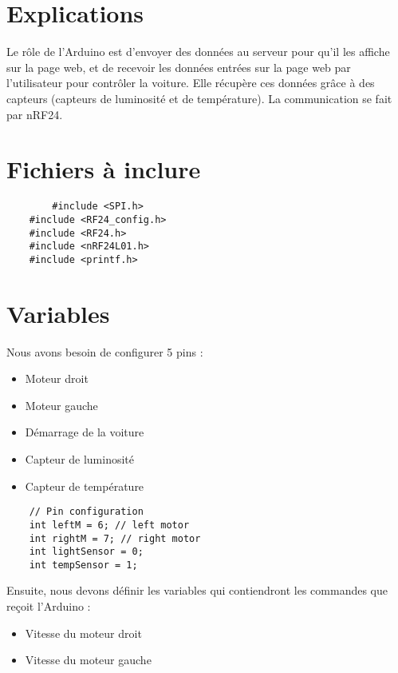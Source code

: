\section{Explications}

Le rôle de l'Arduino est d'envoyer des données au serveur pour qu'il les affiche sur la
page web, et de recevoir les données entrées sur la page web par l'utilisateur pour contrôler
la voiture. Elle récupère ces données grâce à des capteurs (capteurs de luminosité et
de température). La communication se fait par nRF24.

\section{Fichiers à inclure}
\begin{DDbox}{\linewidth}
\begin{lstlisting}
        #include <SPI.h>
	#include <RF24_config.h>
	#include <RF24.h>
	#include <nRF24L01.h>
	#include <printf.h>
\end{lstlisting}
\end{DDbox}

\section{Variables}

Nous avons besoin de configurer 5 pins :
\begin{itemize}
	\item Moteur droit
	\item Moteur gauche
	\item Démarrage de la voiture
	\item Capteur de luminosité
	\item Capteur de température
\end{itemize}
\bigbreak

\begin{DDbox}{\linewidth}
\begin{lstlisting}
	// Pin configuration
	int leftM = 6; // left motor
	int rightM = 7; // right motor
	int lightSensor = 0;
	int tempSensor = 1;

\end{lstlisting}
\end{DDbox}

Ensuite, nous devons définir les variables qui contiendront les commandes que reçoit
l'Arduino :
\begin{itemize}
	\item Vitesse du moteur droit
	\item Vitesse du moteur gauche
\end{itemize}


